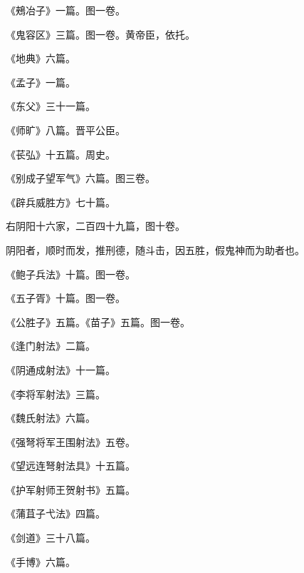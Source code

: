 \documentclass[12pt,UTF8]{ctexbook}
\begin{document}
《鵊冶子》一篇。图一卷。



《鬼容区》三篇。图一卷。黄帝臣，依托。



《地典》六篇。



《孟子》一篇。



《东父》三十一篇。



《师旷》八篇。晋平公臣。



《苌弘》十五篇。周史。



《别成子望军气》六篇。图三卷。



《辟兵威胜方》七十篇。



右阴阳十六家，二百四十九篇，图十卷。



阴阳者，顺时而发，推刑德，随斗击，因五胜，假鬼神而为助者也。



《鲍子兵法》十篇。图一卷。



《五子胥》十篇。图一卷。



《公胜子》五篇。《苗子》五篇。图一卷。



《逢门射法》二篇。



《阴通成射法》十一篇。



《李将军射法》三篇。



《魏氏射法》六篇。



《强弩将军王围射法》五卷。



《望远连弩射法具》十五篇。



《护军射师王贺射书》五篇。



《蒲苴子弋法》四篇。



《剑道》三十八篇。



《手博》六篇。
\end{document}
